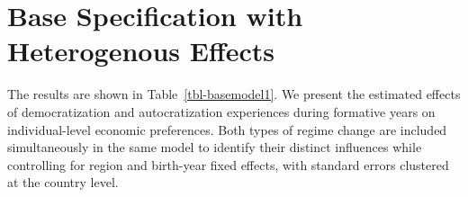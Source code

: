 \documentclass[
  letterpaper,
  DIV=11,
  numbers=noendperiod]{scrartcl}
\begin{document}
\hypertarget{base-specification-with-heterogenous-effects}{%
\section{Base Specification with Heterogenous
Effects}\label{base-specification-with-heterogenous-effects}}

The results are shown in Table~\ref{tbl-basemodel1}. We present the
estimated effects of democratization and autocratization experiences
during formative years on individual-level economic preferences. Both
types of regime change are included simultaneously in the same model to
identify their distinct influences while controlling for region and
birth-year fixed effects, with standard errors clustered at the country
level.

\hypertarget{tbl-basemodel1}{}
\end{document}
